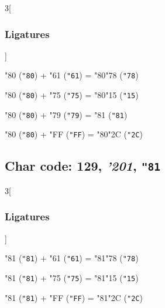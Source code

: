 \documentclass{article}
\newlength{\maxcharwidth}
\begin{document}
\begin{multicols}{3}[\subsubsection{Ligatures}]

{\testfont\char"80\noboundary} ({\tt"80}) + {\testfont\char"61\noboundary} ({\tt"61}) = {\testfont\char"80\noboundary}{\testfont\char"78\noboundary} ({\tt"78}) 

{\testfont\char"80\noboundary} ({\tt"80}) + {\testfont\char"75\noboundary} ({\tt"75}) = {\testfont\char"80\noboundary}{\testfont\char"15\noboundary} ({\tt"15}) 

{\testfont\char"80\noboundary} ({\tt"80}) + {\testfont\char"79\noboundary} ({\tt"79}) = {\testfont\char"81\noboundary} ({\tt"81}) 

{\testfont\char"80\noboundary} ({\tt"80}) + {\testfont\char"FF\noboundary} ({\tt"FF}) = {\testfont\char"80\noboundary}{\testfont\char"2C\noboundary} ({\tt"2C}) 

\end{multicols}

\subsection{Char code: 129, {\it'201}, {\tt"81}}
\label{char_129}


\begin{multicols}{3}[\subsubsection{Ligatures}]

{\testfont\char"81\noboundary} ({\tt"81}) + {\testfont\char"61\noboundary} ({\tt"61}) = {\testfont\char"81\noboundary}{\testfont\char"78\noboundary} ({\tt"78}) 

{\testfont\char"81\noboundary} ({\tt"81}) + {\testfont\char"75\noboundary} ({\tt"75}) = {\testfont\char"81\noboundary}{\testfont\char"15\noboundary} ({\tt"15}) 

{\testfont\char"81\noboundary} ({\tt"81}) + {\testfont\char"FF\noboundary} ({\tt"FF}) = {\testfont\char"81\noboundary}{\testfont\char"2C\noboundary} ({\tt"2C}) 

\end{multicols}
\end{document}
